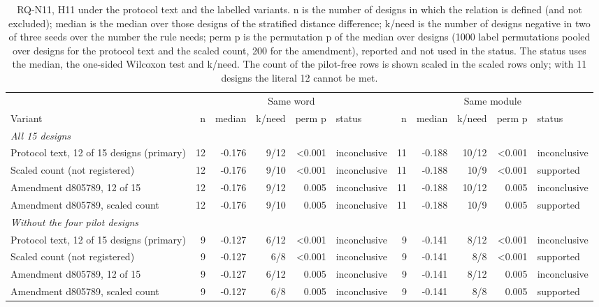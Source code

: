 \begin{table}[t]
\caption{RQ-N11, H11 under the protocol text and the labelled variants. n is the number of designs in which the relation is
defined (and not excluded); median is the median over those designs of the stratified distance difference; k/need is the
number of designs negative in two of three seeds over the number the rule needs; perm p is the permutation p of the median
over designs (1000 label permutations pooled over designs for the protocol text and the scaled count, 200 for the amendment),
reported and not used in the status. The status uses the median, the one-sided Wilcoxon test and k/need. The count of
the pilot-free rows is shown scaled in the scaled rows only; with 11 designs the literal 12 cannot be met.}
\label{tab:r3h11}
\centering
\footnotesize\setlength{\tabcolsep}{3pt}
\begin{tabular}{@{}lrrrrlrrrrl@{}}
\toprule
 & \multicolumn{5}{c}{Same word} & \multicolumn{5}{c}{Same module} \\
\cmidrule(lr){2-6}\cmidrule(lr){7-11}
Variant & n & median & k/need & perm p & status & n & median & k/need & perm p & status \\
\midrule
\multicolumn{11}{l}{\emph{All 15 designs}} \\
Protocol text, 12 of 15 designs (primary) & 12 & -0.176 & 9/12 & <0.001 & inconclusive & 11 & -0.188 & 10/12 & <0.001 & inconclusive \\
Scaled count (not registered) & 12 & -0.176 & 9/10 & <0.001 & inconclusive & 11 & -0.188 & 10/9 & <0.001 & supported \\
Amendment d805789, 12 of 15 & 12 & -0.176 & 9/12 & 0.005 & inconclusive & 11 & -0.188 & 10/12 & 0.005 & inconclusive \\
Amendment d805789, scaled count & 12 & -0.176 & 9/10 & 0.005 & inconclusive & 11 & -0.188 & 10/9 & 0.005 & supported \\
\multicolumn{11}{l}{\emph{Without the four pilot designs}} \\
Protocol text, 12 of 15 designs (primary) & 9 & -0.127 & 6/12 & <0.001 & inconclusive & 9 & -0.141 & 8/12 & <0.001 & inconclusive \\
Scaled count (not registered) & 9 & -0.127 & 6/8 & <0.001 & inconclusive & 9 & -0.141 & 8/8 & <0.001 & supported \\
Amendment d805789, 12 of 15 & 9 & -0.127 & 6/12 & 0.005 & inconclusive & 9 & -0.141 & 8/12 & 0.005 & inconclusive \\
Amendment d805789, scaled count & 9 & -0.127 & 6/8 & 0.005 & inconclusive & 9 & -0.141 & 8/8 & 0.005 & supported \\
\bottomrule
\end{tabular}
\end{table}

